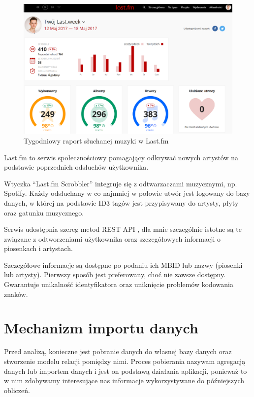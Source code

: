 \documentclass[openright]{xmgr}
\begin{document}
            \begin{figure}
                \includegraphics[width=\linewidth]{fig/lastfm-weekly.png}
                \caption{Tygodniowy raport słuchanej muzyki w Last.fm}
                \label{fig:lastfm-weekly}
            \end{figure}

            Last.fm to serwis społecznościowy pomagający odkrywać nowych artystów na podstawie poprzednich odsłuchów użytkownika.

            Wtyczka ``Last.fm Scrobbler''\cite{lastfm:trackmymusic} integruje się z odtwarzaczami muzycznymi, np. Spotify.
            Każdy odsłuchany w co najmniej w połowie utwór jest logowany do bazy danych,
            w której na podstawie ID3 tagów jest przypisywany do artysty, płyty oraz gatunku muzycznego.

            Serwis udostępnia szereg metod REST API \cite{lastfm:apidoc}, dla mnie szczególnie istotne są te
            związane z odtworzeniami użytkownika oraz szczegółowych informacji o piosenkach i artystach.

            Szczegółowe informacje są dostępne po podaniu ich MBID\cite{lastfm:mbid} lub nazwy (piosenki lub artysty).
            Pierwszy sposób jest preferowany, choć nie zawsze dostępny. Gwarantuje unikalność identyfikatora oraz uniknięcie problemów kodowania znaków.

    \section{Mechanizm importu danych}
        Przed analizą, konieczne jest pobranie danych do własnej bazy danych oraz stworzenie modelu relacji pomiędzy nimi.
        Proces pobierania nazywam agregacją danych lub importem danych i jest on podstawą działania aplikacji,
        ponieważ to w nim zdobywamy interesujące nas informacje wykorzystywane do późniejszych obliczeń.
\end{document}
